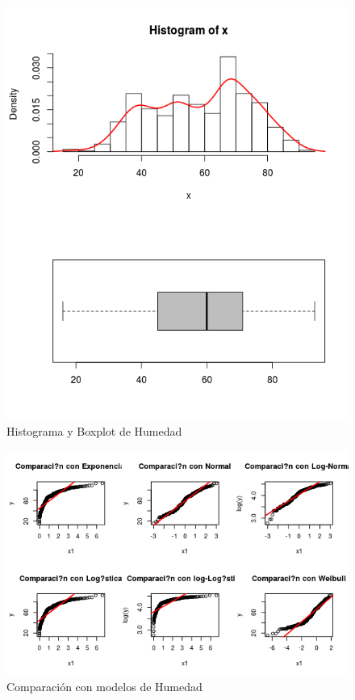 \documentclass{article}
\begin{document}
\begin{enumerate}[a)]
\begin{figure}[h!]
\centering
\includegraphics[scale=0.5]{./figures/histplot_Humedad.png}
\caption{Histograma y Boxplot de Humedad}
\end{figure}

\begin{figure}[h!]
\centering
\includegraphics[scale=0.5]{./figures/cm_Humedad.png}
\caption{Comparación con modelos de Humedad}
\end{figure}


\end{enumerate}
\end{document}
